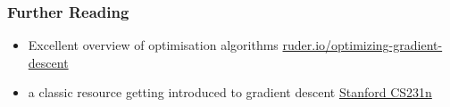 \documentclass[
  aspectratio=1610, %
  intlimits %
]{beamer}
\begin{document}


   \begin{frame}
     \frametitle{Further Reading}

     \vfill
     \begin{itemize}
     \item Excellent overview of optimisation algorithms \href{https://ruder.io/optimizing-gradient-descent/}{ruder.io/optimizing-gradient-descent}
     \item a classic resource getting introduced to gradient descent \href{https://cs231n.github.io/optimization-1/}{Stanford CS231n}
     \end{itemize}
     \vfill
   \end{frame}
\end{document}
